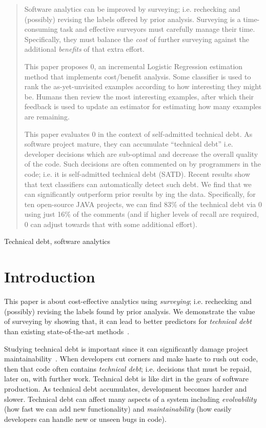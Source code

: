 \documentclass[10pt,conference]{IEEEtran}
\begin{document}
\begin{abstract}
Software analytics can be improved by surveying; i.e.
 rechecking  and (possibly) revising
the labels offered by prior analysis.
Surveying is a time-consuming task and effective surveyors must carefully
manage their time. Specifically, they must balance the {\em cost} of further surveying
against the additional {\em benefits} of that extra effort. 

This paper proposes {\IT}0,
an incremental Logistic Regression estimation method that implements cost/benefit analysis.
Some classifier is used to rank the as-yet-unvisited examples according to how interesting
they might be. Humans then review the most interesting examples, after which their
feedback is
used to update an estimator for estimating how many examples are remaining. 

This paper evaluates {\IT}0  in the context of self-admitted technical debt.
As software project mature, they can accumulate ``technical debt'' i.e. developer decisions which are sub-optimal and decrease the overall quality of the code. 
Such decisions are often commented on by programmers in the code;
i.e. it is   self-admitted technical debt (SATD).  
Recent results show that text classifiers can automatically detect such debt. 
We find that we can significantly outperform prior results by {\IT}ing the
data. 
Specifically, for ten open-source JAVA projects, we can find 83\% of the technical debt via
{\IT}0 using
just 16\% of the comments (and if higher levels of recall are required, {\IT}0 can adjust towards that with some additional effort).
\end{abstract}

\begin{IEEEkeywords}
Technical debt,   software analytics
\end{IEEEkeywords}

\section{Introduction}
\label{section intro}
This paper is about cost-effective analytics using {\em surveying};
i.e. 
 rechecking  and (possibly) revising
the labels found by prior analysis.
We demonstrate the value of surveying by showing that, it can lead to   better
predictors for {\em technical debt}
than existing state-of-the-art methods~\cite{huang2018identifying}. 

Studying technical debt is important since it can significantly damage
project maintainability~\cite{cunningham1993wycash,guo2011tracking,nugroho2011empirical}.
When developers cut corners and make haste to rush out code, then that code
often contains {\em technical debt}; i.e. decisions that must be repaid, later on, with further work.
Technical debt is like dirt in the gears of software production.
As technical debt accumulates,   development becomes harder and slower. Technical debt can affect many aspects of a system including {\em evolvability} (how fast we can add new functionality) and {\em maintainability} (how easily developers can handle new or unseen bugs in code).
\end{document}
